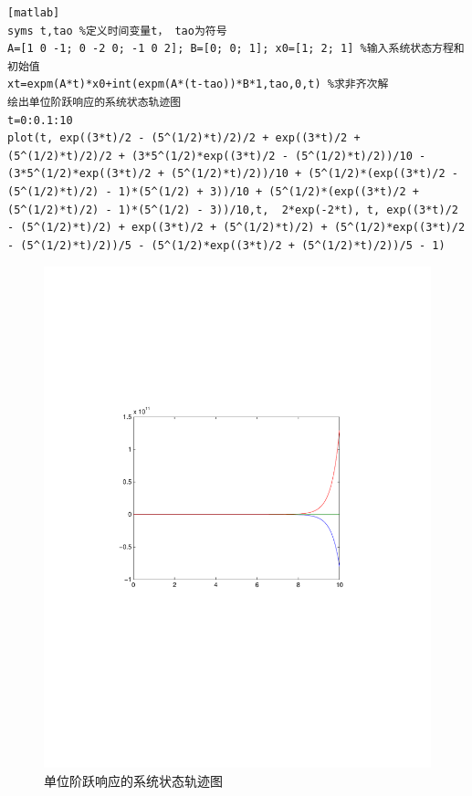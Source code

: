 \documentclass[a4paper]{article}
\begin{document}
\begin{verbatim}[matlab]
syms t,tao %定义时间变量t， tao为符号
A=[1 0 -1; 0 -2 0; -1 0 2]; B=[0; 0; 1]; x0=[1; 2; 1] %输入系统状态方程和初始值
xt=expm(A*t)*x0+int(expm(A*(t-tao))*B*1,tao,0,t) %求非齐次解
绘出单位阶跃响应的系统状态轨迹图
t=0:0.1:10
plot(t, exp((3*t)/2 - (5^(1/2)*t)/2)/2 + exp((3*t)/2 + (5^(1/2)*t)/2)/2 + (3*5^(1/2)*exp((3*t)/2 - (5^(1/2)*t)/2))/10 - (3*5^(1/2)*exp((3*t)/2 + (5^(1/2)*t)/2))/10 + (5^(1/2)*(exp((3*t)/2 - (5^(1/2)*t)/2) - 1)*(5^(1/2) + 3))/10 + (5^(1/2)*(exp((3*t)/2 + (5^(1/2)*t)/2) - 1)*(5^(1/2) - 3))/10,t,  2*exp(-2*t), t, exp((3*t)/2 - (5^(1/2)*t)/2) + exp((3*t)/2 + (5^(1/2)*t)/2) + (5^(1/2)*exp((3*t)/2 - (5^(1/2)*t)/2))/5 - (5^(1/2)*exp((3*t)/2 + (5^(1/2)*t)/2))/5 - 1)
\end{verbatim}
\begin{figure}[h]  %
\centering
\includegraphics{num2} 
\caption{单位阶跃响应的系统状态轨迹图}
\end{figure}
\end{document}
